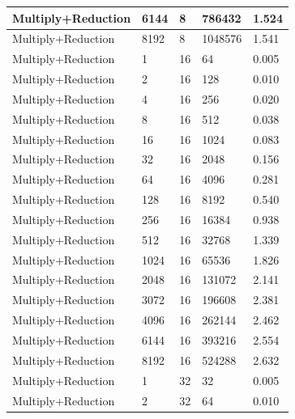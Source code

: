 \documentclass{article}
\begin{document}
\begin{longtable}{|l|l|l|l|l|}
Multiply+Reduction & 6144 & 8           & 786432            & 1.524             \\ \hline
Multiply+Reduction & 8192 & 8           & 1048576           & 1.541             \\ \hline
Multiply+Reduction & 1    & 16          & 64                & 0.005             \\ \hline
Multiply+Reduction & 2    & 16          & 128               & 0.010             \\ \hline
Multiply+Reduction & 4    & 16          & 256               & 0.020             \\ \hline
Multiply+Reduction & 8    & 16          & 512               & 0.038             \\ \hline
Multiply+Reduction & 16   & 16          & 1024              & 0.083             \\ \hline
Multiply+Reduction & 32   & 16          & 2048              & 0.156             \\ \hline
Multiply+Reduction & 64   & 16          & 4096              & 0.281             \\ \hline
Multiply+Reduction & 128  & 16          & 8192              & 0.540             \\ \hline
Multiply+Reduction & 256  & 16          & 16384             & 0.938             \\ \hline
Multiply+Reduction & 512  & 16          & 32768             & 1.339             \\ \hline
Multiply+Reduction & 1024 & 16          & 65536             & 1.826             \\ \hline
Multiply+Reduction & 2048 & 16          & 131072            & 2.141             \\ \hline
Multiply+Reduction & 3072 & 16          & 196608            & 2.381             \\ \hline
Multiply+Reduction & 4096 & 16          & 262144            & 2.462             \\ \hline
Multiply+Reduction & 6144 & 16          & 393216            & 2.554             \\ \hline
Multiply+Reduction & 8192 & 16          & 524288            & 2.632             \\ \hline
Multiply+Reduction & 1    & 32          & 32                & 0.005             \\ \hline
Multiply+Reduction & 2    & 32          & 64                & 0.010             \\ \hline

\end{longtable}
\end{document}
